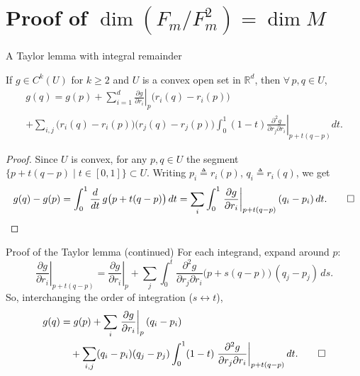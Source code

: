 \documentclass[10pt]{beamer}
\newcommand{\R}{\mathbb{R}}
\begin{document}
\section{Proof of $\dim(F_m/F_m^2) = \dim M$}

\begin{frame}{A Taylor lemma with integral remainder}
	\small
	\begin{lemma}
		If $g \in C^k(U)$ for $k \geq 2$ and $U$ is a convex open set in
		$\R^d$, then $\forall\, p, q \in U$,
		\begin{multline*}
			g(q) = g(p) + \sum_{i=1}^{d}
			\left. \frac{\partial g}{\partial r_i} \right|_{p}
			\bigl(r_i(q) - r_i(p)\bigr) \\
			+ \sum_{i,j} \bigl(r_i(q) - r_i(p)\bigr)
			\bigl(r_j(q) - r_j(p)\bigr)
			\int_0^1 (1-t)
			\left. \frac{\partial^2 g}{\partial r_j \partial r_i}
			\right|_{p + t(q - p)} dt .
		\end{multline*}
	\end{lemma}
	\begin{proof}
		Since $U$ is convex, for any $p, q \in U$ the segment
		$\{ p + t(q-p) \mid t \in [0,1] \} \subset U$. Writing
		$p_i \triangleq r_i(p)$, $q_i \triangleq r_i(q)$, we get
		\[
			g(q) - g(p)
			= \int_0^1 \frac{d}{dt}\, g\bigl(p + t(q-p)\bigr)\, dt
			= \sum_i \int_0^1
			\left. \frac{\partial g}{\partial r_i}
			\right|_{p + t(q-p)} (q_i - p_i)\, dt .
			\qedhere
		\]
	\end{proof}
\end{frame}

\begin{frame}{Proof of the Taylor lemma (continued)}
	For each integrand, expand around $p$:
	\[
		\left. \frac{\partial g}{\partial r_i}
		\right|_{p + t(q-p)}
		= \left. \frac{\partial g}{\partial r_i} \right|_{p}
		+ \sum_j \int_0^t
		\frac{\partial^2 g}{\partial r_j \partial r_i}
		\bigl(p + s(q-p)\bigr)\, (q_j - p_j)\, ds .
	\]
	So, interchanging the order of integration ($s \leftrightarrow t$),
	\begin{align*}
		g(q) & = g(p) + \sum_i
		\left. \frac{\partial g}{\partial r_i} \right|_{p} (q_i - p_i)  \\
		     & \quad + \sum_{i,j} (q_i - p_i)(q_j - p_j) \int_0^1 (1-t)
		\left. \frac{\partial^2 g}{\partial r_j \partial r_i}
		\right|_{p + t(q-p)} dt .
		\qedhere
	\end{align*}
\end{frame}
\end{document}
